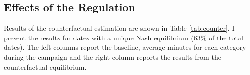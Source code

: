 \documentclass[12pt]{article}
\begin{document}




\subsection{Effects of the Regulation}

Results of the counterfactual estimation are shown in Table \ref{tab:counter}. I present the results for dates with a unique Nash equilibrium ($63\%$ of the total dates). The left columns report the baseline, average minutes for each category during the campaign and the right column reports the results from the counterfactual equilibrium. 

\end{document}
